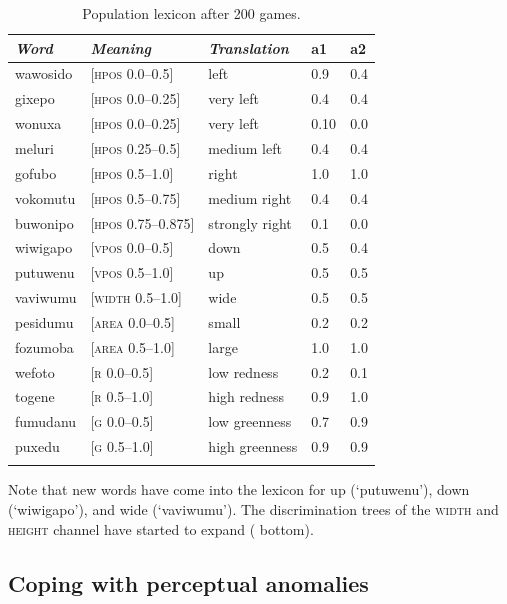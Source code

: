 \begin{table}
\begin{center}
\begin{tabular}{lllll}
\lsptoprule
{\itshape Word}&{\itshape Meaning}&{\itshape Translation} & {\bfshape a1}&{\bfshape a2} \\ \midrule
wawosido & [\textsc{hpos} 0.0–0.5] &left&0.9&0.4\\ 
gixepo & [\textsc{hpos} 0.0–0.25] & very left&0.4&0.4\\ 
wonuxa & [\textsc{hpos} 0.0–0.25] & very left&0.10&0.0\\ 
meluri & [\textsc{hpos} 0.25–0.5] &medium left&0.4&0.4\\ 
gofubo & [\textsc{hpos} 0.5–1.0]& right&1.0&1.0\\ 
vokomutu & [\textsc{hpos} 0.5–0.75] &medium right&0.4&0.4\\ 
buwonipo & [\textsc{hpos} 0.75–0.875] &strongly right&0.1&0.0\\ 
wiwigapo & [\textsc{vpos} 0.0–0.5] &down&0.5&0.4\\ 
putuwenu & [\textsc{vpos} 0.5–1.0]&up & 0.5&0.5\\ 
vaviwumu & [\textsc{width} 0.5–1.0]&wide & 0.5&0.5\\ 
pesidumu & [\textsc{area} 0.0–0.5]&small& 0.2&0.2\\ 
fozumoba & [\textsc{area} 0.5–1.0]&large & 1.0&1.0\\ 
wefoto & [\textsc{r} 0.0–0.5]& low redness &0.2&0.1\\ 
togene & [\textsc{r} 0.5–1.0]& high redness &0.9&1.0\\ 
fumudanu & [\textsc{g} 0.0–0.5]& low greenness &0.7&0.9\\ 
puxedu & [\textsc{g} 0.5–1.0]& high greenness &0.9&0.9\\ 
\lspbottomrule
\end{tabular}
\caption{\label{tab:upper}Population lexicon after 200 games.}
\end{center}
\end{table}
Note that new words have come into the lexicon 
for up (`putuwenu'), down (`wiwigapo'), and 
wide (`vaviwumu'). The discrimination trees of 
the \textsc{width} and \textsc{height} channel have started to 
expand ( bottom). 

\subsection{Coping with perceptual anomalies}

